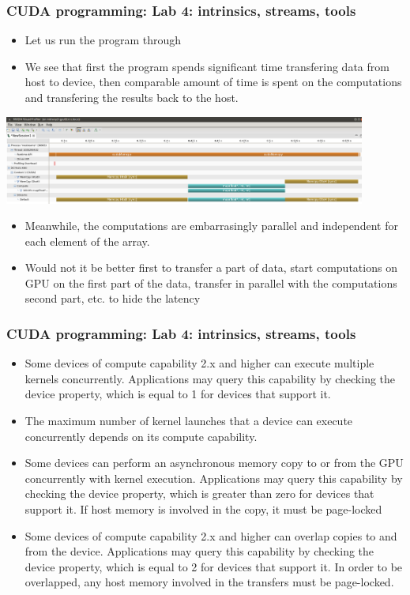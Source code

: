 \begin{frame}[fragile]
  \frametitle{CUDA programming: Lab 4: intrinsics, streams, tools}
\begin{itemize}
\item Let us run the program through 
\item We see that first the program spends significant time transfering data from host to device, then comparable amount of time is spent on the computations and transfering the results back to the host.
\end{itemize}
\includegraphics[width=11.9cm]{graphs/nostreams.png}
\begin{itemize}
\item Meanwhile, the computations are embarrasingly parallel and independent for each element of the array.
\item Would not it be better first to transfer a part of data, start computations on GPU on the first part of the data, transfer in parallel with the computations second part, etc. to hide the latency
\end{itemize}
\end{frame}

\begin{frame}[fragile]
  \frametitle{CUDA programming: Lab 4: intrinsics, streams, tools}
\begin{itemize}
\item Some devices of compute capability 2.x and higher can execute multiple
kernels concurrently. Applications may query this capability by checking the
 device property, which is equal to 1 for
devices that support it.
\item The maximum number of kernel launches that a device can execute concurrently
depends on its compute capability.
\item Some devices can perform an asynchronous memory copy to or from the GPU
concurrently with kernel execution. Applications may query this capability by checking
the  device property, which is greater
than zero for devices that support it. If host memory is involved in the copy, it must be
page-locked
\item Some devices of compute capability 2.x and higher can overlap copies to and from the
device. Applications may query this capability by checking the 
device property, which is equal to 2 for devices that support
it. In order to be overlapped, any host memory involved in the transfers must be page-locked.

\end{itemize}
\end{frame}


